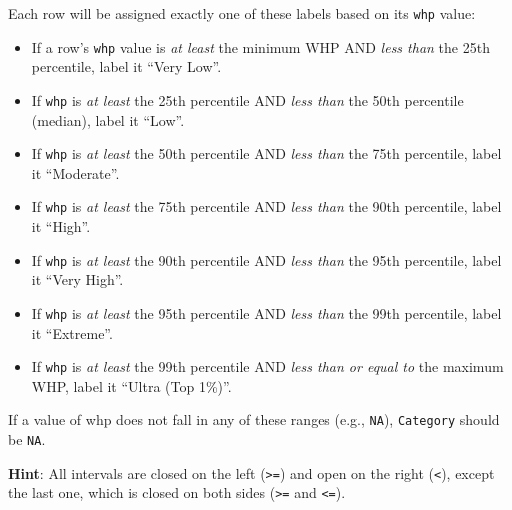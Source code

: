 \documentclass[
  12pt,
]{scrreprt}
\begin{document}
Each row will be assigned exactly one of these labels based on its \texttt{whp} value:

\begin{itemize}
\item
  If a row's \texttt{whp} value is \emph{at least} the minimum WHP AND \emph{less than} the 25th percentile, label it ``Very Low''.
\item
  If \texttt{whp} is \emph{at least} the 25th percentile AND \emph{less than} the 50th percentile (median), label it ``Low''.
\item
  If \texttt{whp} is \emph{at least} the 50th percentile AND \emph{less than} the 75th percentile, label it ``Moderate''.
\item
  If \texttt{whp} is \emph{at least} the 75th percentile AND \emph{less than} the 90th percentile, label it ``High''.
\item
  If \texttt{whp} is \emph{at least} the 90th percentile AND \emph{less than} the 95th percentile, label it ``Very High''.
\item
  If \texttt{whp} is \emph{at least} the 95th percentile AND \emph{less than} the 99th percentile, label it ``Extreme''.
\item
  If \texttt{whp} is \emph{at least} the 99th percentile AND \emph{less than or equal to} the maximum WHP, label it ``Ultra (Top 1\%)''.
\end{itemize}

If a value of whp does not fall in any of these ranges (e.g., \texttt{NA}), \texttt{Category} should be \texttt{NA}.

\textbf{Hint}: All intervals are closed on the left (\texttt{\textgreater{}=}) and open on the right (\texttt{\textless{}}), except the last one, which is closed on both sides (\texttt{\textgreater{}=} and \texttt{\textless{}=}).
\end{document}
